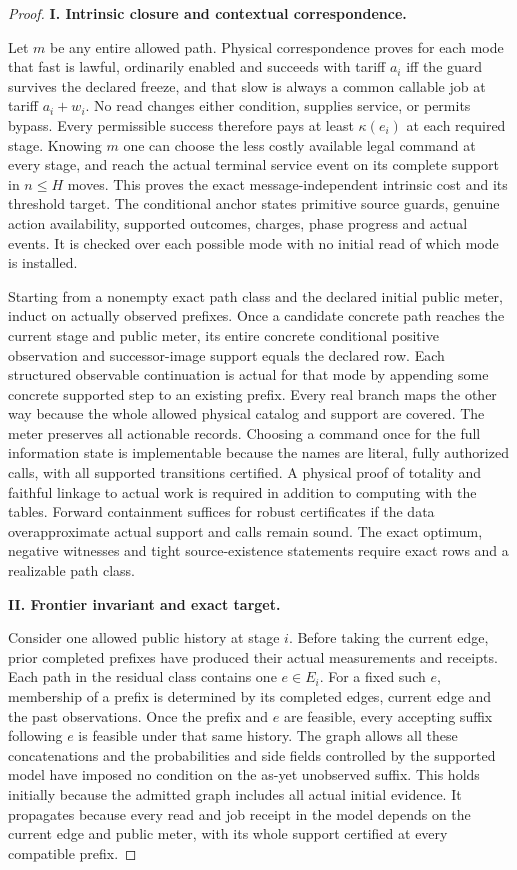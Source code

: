 \begin{proof}

\textbf{I. Intrinsic closure and contextual correspondence.}

Let \(m\) be any entire allowed path. Physical correspondence proves for each mode that fast is lawful, ordinarily enabled and succeeds with tariff \(a_i\) iff the guard survives the declared freeze, and that slow is always a common callable job at tariff \(a_i+w_i\). No read changes either condition, supplies service, or permits bypass. Every permissible success therefore pays at least \(\kappa(e_i)\) at each required stage. Knowing \(m\) one can choose the less costly available legal command at every stage, and reach the actual terminal service event on its complete support in \(n\le H\) moves. This proves the exact message-independent intrinsic cost and its threshold target. The conditional anchor states primitive source guards, genuine action availability, supported outcomes, charges, phase progress and actual events. It is checked over each possible mode with no initial read of which mode is installed.

Starting from a nonempty exact path class and the declared initial public meter, induct on actually observed prefixes. Once a candidate concrete path reaches the current stage and public meter, its entire concrete conditional positive observation and successor-image support equals the declared row. Each structured observable continuation is actual for that mode by appending some concrete supported step to an existing prefix. Every real branch maps the other way because the whole allowed physical catalog and support are covered. The meter preserves all actionable records. Choosing a command once for the full information state is implementable because the names are literal, fully authorized calls, with all supported transitions certified. A physical proof of totality and faithful linkage to actual work is required in addition to computing with the tables. Forward containment suffices for robust certificates if the data overapproximate actual support and calls remain sound. The exact optimum, negative witnesses and tight source-existence statements require exact rows and a realizable path class.

\textbf{II. Frontier invariant and exact target.}

Consider one allowed public history at stage \(i\). Before taking the current edge, prior completed prefixes have produced their actual measurements and receipts. Each path in the residual class contains one \(e\in E_i\). For a fixed such \(e\), membership of a prefix is determined by its completed edges, current edge and the past observations. Once the prefix and \(e\) are feasible, every accepting suffix following \(e\) is feasible under that same history. The graph allows all these concatenations and the probabilities and side fields controlled by the supported model have imposed no condition on the as-yet unobserved suffix. This holds initially because the admitted graph includes all actual initial evidence. It propagates because every read and job receipt in the model depends on the current edge and public meter, with its whole support certified at every compatible prefix.


\end{proof}
